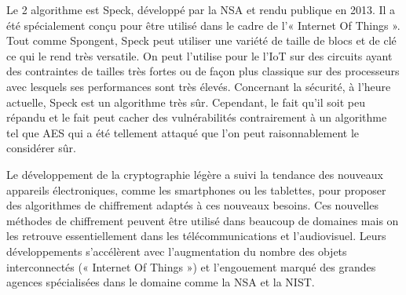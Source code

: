 	Le 2 algorithme est Speck, développé par la NSA et rendu publique en
	2013. Il a été spécialement conçu pour être utilisé dans le cadre de l'«
	Internet Of Things ». Tout comme Spongent, Speck peut utiliser une variété de
	taille de blocs et de clé ce qui le rend très versatile. On peut l'utilise pour
	le l'IoT sur des circuits ayant des contraintes de tailles très fortes ou de
	façon plus classique sur des processeurs avec lesquels ses performances sont
	très élevés. Concernant la sécurité, à l'heure actuelle, Speck est un algorithme
	très sûr. Cependant, le fait qu'il soit peu répandu et le fait peut cacher des
	vulnérabilités contrairement à un algorithme tel que AES qui a été tellement
	attaqué que l'on peut raisonnablement le considérer sûr.


	 Le développement de la cryptographie légère a suivi la tendance des nouveaux
	appareils électroniques, comme les smartphones ou les tablettes, pour proposer
	des algorithmes de chiffrement adaptés à ces nouveaux besoins. Ces nouvelles
	méthodes de chiffrement peuvent être utilisé dans beaucoup de domaines mais on
	les retrouve essentiellement dans les télécommunications et l'audiovisuel.
	Leurs développements s'accélèrent avec l'augmentation du nombre des objets
	interconnectés (« Internet Of Things ») et l'engouement marqué des grandes
	agences spécialisées dans le domaine comme la NSA et la NIST.
